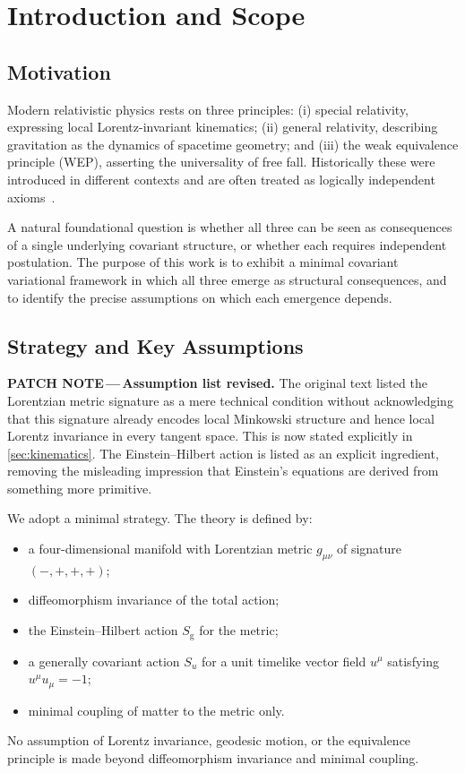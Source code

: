 \documentclass[12pt,a4paper]{article}
\newcommand{\patchnote}[1]{%
  \begin{patchbox}
    {\small\color{patchtext}\textbf{PATCH NOTE\,---\,}#1}
  \end{patchbox}}
\newcommand{\EH}{S_{\mathrm{g}}}
\newcommand{\Su}{S_{u}}
\begin{document}
\section{Introduction and Scope}
\label{sec:intro}

\subsection{Motivation}

Modern relativistic physics rests on three principles: (i) special relativity,
expressing local Lorentz-invariant kinematics; (ii) general relativity,
describing gravitation as the dynamics of spacetime geometry; and (iii) the
weak equivalence principle (WEP), asserting the universality of free fall.
Historically these were introduced in different contexts and are often treated
as logically independent axioms~\citep{will2014,einstein1905,einstein1915}.

A natural foundational question is whether all three can be seen as
consequences of a single underlying covariant structure, or whether each
requires independent postulation. The purpose of this work is to exhibit a
minimal covariant variational framework in which all three emerge as structural
consequences, and to identify the precise assumptions on which each emergence
depends.

\subsection{Strategy and Key Assumptions}
\label{sec:assumptions}

\patchnote{\textbf{Assumption list revised.}
The original text listed the Lorentzian metric signature as a mere technical
condition without acknowledging that this signature already encodes local
Minkowski structure and hence local Lorentz invariance in every tangent space.
This is now stated explicitly in \cref{sec:kinematics}. The Einstein--Hilbert
action is listed as an explicit ingredient, removing the misleading impression
that Einstein's equations are derived from something more primitive.}

We adopt a minimal strategy. The theory is defined by:
\begin{itemize}[noitemsep]
  \item a four-dimensional manifold with Lorentzian metric $g_{\mu\nu}$
        of signature $(-,+,+,+)$;
  \item diffeomorphism invariance of the total action;
  \item the Einstein--Hilbert action $\EH$ for the metric;
  \item a generally covariant action $\Su$ for a unit timelike vector field
        $u^{\mu}$ satisfying $u^{\mu}u_{\mu}=-1$;
  \item minimal coupling of matter to the metric only.
\end{itemize}
No assumption of Lorentz invariance, geodesic motion, or the equivalence
principle is made beyond diffeomorphism invariance and minimal coupling.
\end{document}
